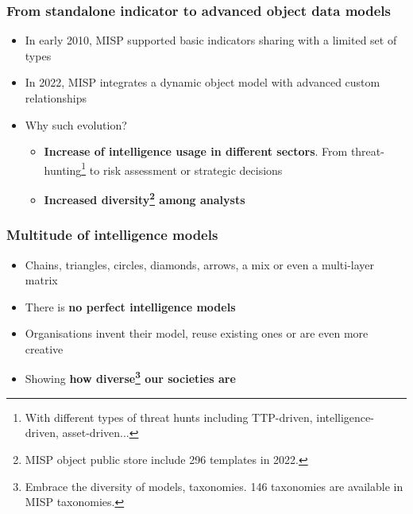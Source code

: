 \begin{frame}
  \frametitle{From standalone indicator to advanced object data models}
  \begin{itemize}
    \item In early 2010, MISP supported basic indicators sharing with a limited set of types
    \item In 2022, MISP integrates a dynamic object model with advanced custom relationships 
    \item Why such evolution?
        \begin{itemize}
            \item {\bf Increase of intelligence usage in different sectors}. From threat-hunting\footnote{With different types of threat hunts including TTP-driven, intelligence-driven, asset-driven...} to risk assessment or strategic decisions
            \item {\bf Increased diversity\footnote{MISP object public store include 296 templates in 2022.} among analysts}
        \end{itemize}
  \end{itemize}
\end{frame}

\begin{frame}
  \frametitle{Multitude of intelligence models}
  \begin{itemize}
     \item Chains, triangles, circles, diamonds, arrows, a mix or even a multi-layer matrix
     \item There is {\bf no perfect intelligence models}
     \item Organisations invent their model, reuse existing ones or are even more creative
     \item Showing {\bf how diverse\footnote{Embrace the diversity of models, taxonomies. 146 taxonomies are available in MISP taxonomies.} our societies are}
  \end{itemize}
\end{frame}

